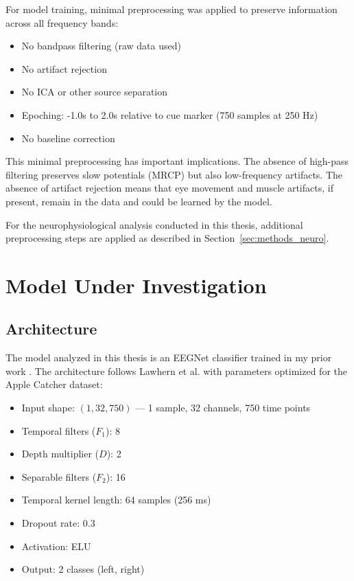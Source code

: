 For model training, minimal preprocessing was applied to preserve information across all frequency bands:

\begin{itemize}
    \item No bandpass filtering (raw data used)
    \item No artifact rejection
    \item No ICA or other source separation
    \item Epoching: -1.0s to 2.0s relative to cue marker (750 samples at 250 Hz)
    \item No baseline correction
\end{itemize}

This minimal preprocessing has important implications. The absence of high-pass filtering preserves slow potentials (MRCP) but also low-frequency artifacts. The absence of artifact rejection means that eye movement and muscle artifacts, if present, remain in the data and could be learned by the model.

For the neurophysiological analysis conducted in this thesis, additional preprocessing steps are applied as described in Section~\ref{sec:methods_neuro}.


\section{Model Under Investigation}
\label{sec:methods_model}

\subsection{Architecture}
\label{subsec:methods_architecture}

The model analyzed in this thesis is an EEGNet classifier trained in my prior work \cite{fritzner2025specialization}. The architecture follows Lawhern et al. \cite{lawhern2018eegnet} with parameters optimized for the Apple Catcher dataset:

\begin{itemize}
    \item Input shape: $(1, 32, 750)$ — 1 sample, 32 channels, 750 time points
    \item Temporal filters ($F_1$): 8
    \item Depth multiplier ($D$): 2
    \item Separable filters ($F_2$): 16
    \item Temporal kernel length: 64 samples (256 ms)
    \item Dropout rate: 0.3
    \item Activation: ELU
    \item Output: 2 classes (left, right)
\end{itemize}

